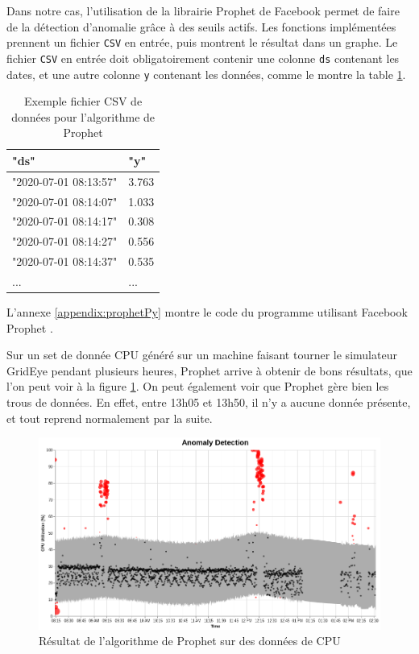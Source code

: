 \documentclass[paper=a4, fontsize=11pt]{scrartcl}
\begin{document}
Dans notre cas, l'utilisation de la librairie Prophet de Facebook permet de faire de la détection d'anomalie grâce à des seuils actifs. Les fonctions implémentées prennent un fichier \verb,CSV, en entrée, puis montrent le résultat dans un graphe. Le fichier \verb,CSV, en entrée doit obligatoirement contenir une colonne \verb,ds, contenant les dates, et une autre colonne \verb,y, contenant les données, comme le montre la table \ref{t-ExempleCSVProphet}.

\begin{table}[H]
\centering
\begin{tabular}{ |m{4cm}|m{4cm}|  }
    \hline
    "ds" & "y" \\
    \hline
    "2020-07-01 08:13:57" & 3.763 \\
    \hline
    "2020-07-01 08:14:07" & 1.033 \\
    \hline
    "2020-07-01 08:14:17" & 0.308 \\
    \hline
    "2020-07-01 08:14:27" & 0.556 \\
    \hline
    "2020-07-01 08:14:37" & 0.535 \\
    \hline
    ... & ... \\
    \hline
\end{tabular}
\caption{Exemple fichier CSV de données pour l'algorithme de Prophet}
\label{t-ExempleCSVProphet}
\end{table}

L'annexe \ref{appendix:prophetPy} montre le code du programme utilisant Facebook Prophet \cite{ashrapov_anomaly_2020}.


Sur un set de donnée CPU généré sur un machine faisant tourner le simulateur GridEye pendant plusieurs heures, Prophet arrive à obtenir de bons résultats, que l'on peut voir à la figure \ref{f-ProphetCPU}. On peut également voir que Prophet gère bien les trous de données. En effet, entre 13h05 et 13h50, il n'y a aucune donnée présente, et tout reprend normalement par la suite.

\begin{figure}[H]
    \centering
    \includegraphics[width=18cm]{img/AD_prophet_CPU.png}
    \caption{Résultat de l'algorithme de Prophet sur des données de CPU}
    \label{f-ProphetCPU}
\end{figure}
\end{document}
